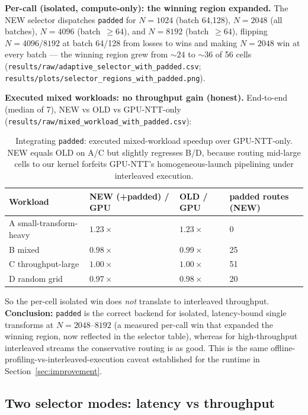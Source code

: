 \documentclass[11pt,a4paper]{article}
\begin{document}
\textbf{Per-call (isolated, compute-only): the winning region expanded.} The NEW selector dispatches
\texttt{padded} for $N=1024$ (batch 64,128), $N=2048$ (all batches), $N=4096$ (batch~$\ge64$), and
$N=8192$ (batch~$\ge64$), flipping $N=4096/8192$ at batch 64/128 from losses to wins and making
$N=2048$ win at every batch --- the winning region grew from ${\sim}24$ to ${\sim}36$ of 56 cells
(\texttt{results/raw/adaptive\_selector\_with\_padded.csv};
\texttt{results/plots/selector\_regions\_with\_padded.png}).

\textbf{Executed mixed workloads: no throughput gain (honest).} End-to-end (median of 7), NEW vs OLD
vs GPU-NTT-only (\texttt{results/raw/mixed\_workload\_with\_padded.csv}):

\begin{table}[h]
\centering
\caption{Integrating \texttt{padded}: executed mixed-workload speedup over GPU-NTT-only. NEW equals
OLD on A/C but slightly regresses B/D, because routing mid-large cells to our kernel forfeits
GPU-NTT's homogeneous-launch pipelining under interleaved execution.}
\begin{tabular}{L{4.0cm}R{2.6cm}R{2.4cm}R{2.6cm}}
\toprule
Workload & NEW (+padded) / GPU & OLD / GPU & padded routes (NEW) \\
\midrule
A small-transform-heavy & $1.23\times$ & $1.23\times$ & 0 \\
B mixed                  & $0.98\times$ & $0.99\times$ & 25 \\
C throughput-large       & $1.00\times$ & $1.00\times$ & 51 \\
D random grid            & $0.97\times$ & $0.98\times$ & 20 \\
\bottomrule
\end{tabular}
\end{table}

So the per-cell isolated win does \emph{not} translate to interleaved throughput. \textbf{Conclusion:}
\texttt{padded} is the correct backend for isolated, latency-bound single transforms at
$N=2048$--$8192$ (a measured per-call win that expanded the winning region, now reflected in the
selector table), whereas for high-throughput interleaved streams the conservative routing is as good.
This is the same offline-profiling-vs-interleaved-execution caveat established for the runtime in
Section~\ref{sec:improvement}.

\subsection{Two selector modes: latency vs throughput}
\label{sec:modes}
\end{document}
